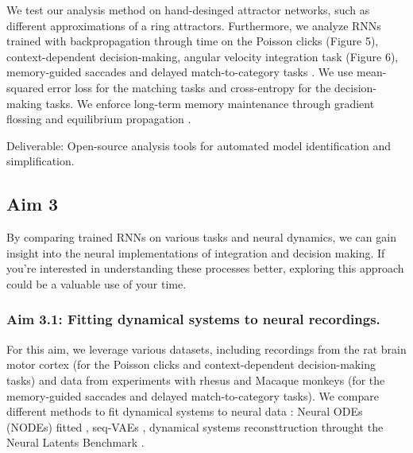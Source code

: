 \documentclass[12pt,letterpaper, onecolumn]{article}
\theoremstyle{definition}
\theoremstyle{remark}
\begin{document}
We test our analysis method on hand-desinged attractor networks, such as different approximations of a ring attractors.
%
Furthermore, we analyze RNNs trained with backpropagation through time on the Poisson clicks (Figure 5), context-dependent decision-making, angular velocity integration task (Figure 6), memory-guided saccades  and delayed match-to-category tasks \citep{farrell2022, schuessler2020}.
We use mean-squared error loss for the matching tasks and cross-entropy for the decision-making tasks.
We enforce long-term  memory maintenance through gradient flossing \citep{engelken2023b} and equilibrium propagation \citep{laborieux2023}.


Deliverable: Open-source analysis tools for automated model identification and simplification.


%
%






\newpage

\subsection*{Aim 3}

By comparing trained RNNs on various tasks and neural dynamics, we can gain insight into the neural implementations of integration and decision making. If you're interested in understanding these processes better, exploring this approach could be a valuable use of your time.


\subsubsection*{Aim 3.1: Fitting dynamical systems to neural recordings.}

For this aim, we leverage various datasets, including recordings from the rat brain motor cortex (for the Poisson clicks and context-dependent decision-making tasks) and data from experiments with rhesus and Macaque monkeys (for the memory-guided saccades and delayed match-to-category tasks).
%
We compare different methods to fit dynamical systems to neural data \citep{Zhao2016d}:
 Neural ODEs (NODEs) fitted \citep{kim2021inferring},
 seq-VAEs \citep{pandarinath2018inferring},
dynamical systems reconsttruction \citep{schmidt2019} throught the Neural Latents Benchmark \citep{pei2021neural}.
%
\end{document}
